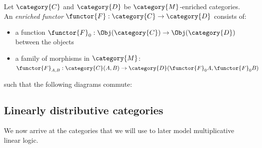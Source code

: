 \documentclass[DIN, pagenumber=false, fontsize=11pt, parskip=half, colorinlistoftodos, svgnames]{scrartcl}
\begin{document}
	\begin{definition}
		\label{def: enrichedFunctors}
		Let $\category{C} $ and $\category{D} $ be $\category{M} $-enriched categories. An \emph{enriched functor} $\functor{F} : \category{C} \rightarrow \category{D} $ consists of:
		\begin{itemize}
			\item 
			a function $\functor{F}_0 : \Obj(\category{C}) \rightarrow \Obj(\category{D}) $ between the objects
			\item 
			a family of morphisms in $\category{M} $: $\functor{F}_{A,B} : \category{C}(A, B) \rightarrow \category{D}(\functor{F}_0 A , \functor{F}_0 B) $
		\end{itemize}
		such that the following diagrams commute:
		\begin{center}
			
		\end{center}
	\end{definition}
\fi

	
	\subsection{Linearly distributive categories }
	\label{subsec: linDisCats}
	
	We now arrive at the categories that we will use to later model multiplicative linear logic.
	
\end{document}

